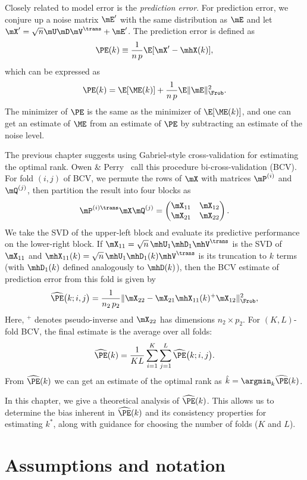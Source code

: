 Closely related to model error is the \emph{prediction error}.  For prediction error, we conjure up a noise matrix $\mE'$ with the same distribution as $\mE$ and let $\mX' = \sqrt{n} \mU \mD \mV^\trans + \mE'$.  The prediction error is defined as
\[
    \PE(k) \equiv \frac{1}{n \, p} \E[ \mX' - \mhX(k) ],
\]
which can be expressed as
\[
    \PE(k) = \E[ \ME(k) ] + \frac{1}{n \, p} \E \| \mE \|_\Frob^2.
\]
The minimizer of $\PE$ is the same as the minimizer of $\E[ \ME(k) ]$,
and one can get an estimate of $\ME$ from an estimate of $\PE$ by subtracting an estimate of the noise level.

The previous chapter suggests using Gabriel-style cross-validation for estimating the optimal rank.  Owen \& Perry~\cite{owen2009bi} call this procedure bi-cross-validation (BCV).  For fold $(i,j)$ of BCV, we permute
the rows of $\mX$ with matrices $\mP^{(i)}$ and $\mQ^{(j)}$, then partition the result into four blocks as
\[
    \mP^{(i)\trans} \mX \mQ^{(j)}
        =
        \left(
        \begin{matrix}
            \mX_{11} & \mX_{12} \\
            \mX_{21} & \mX_{22}
        \end{matrix}
        \right).
\]
We take the SVD of the upper-left block and evaluate its predictive 
performance on the lower-right block.  If 
$\mX_{11} = \sqrt{n} \, \mhU_1 \mhD_1 \mhV^\trans$ is the SVD of $\mX_{11}$ and
$\mhX_{11}(k) = \sqrt{n} \, \mhU_1 \mhD_1(k) \mhV^\trans$ is its truncation to 
$k$ terms (with $\mhD_1(k)$ defined analogously to $\mhD(k)$), then the BCV estimate of prediction error from this fold is given 
by
\[
    \widehat{\PE}\big(k ; i, j \big)
        =
            \frac{1}{n_2 \, p_2}
            \| \mX_{22} - \mX_{21} \mhX_{11}(k)^+ \mX_{12} \|_\Frob^2,
\]
Here, $^+$ denotes pseudo-inverse and $\mX_{22}$ has dimensions $n_2 \times p_2$.  For $(K,L)$-fold BCV, the final estimate is the average over all folds:
\[
    \widehat{\PE}(k)
        =
        \frac{1}{K L}
        \sum_{i=1}^K
        \sum_{j=1}^L
            \widehat{\PE}\big(k ; i, j \big).
\]
From $\widehat{\PE}(k)$ we can get an estimate of the optimal rank as
$\hat k = \argmin_k \widehat{\PE}(k)$.

In this chapter, we give a theoretical analysis of $\widehat{\PE}(k)$.  This allows us to determine the bias inherent in $\widehat{\PE}(k)$ and its consistency properties for estimating $k^\ast$, along with guidance for choosing the number of folds ($K$ and $L$).


\section{Assumptions and notation}

